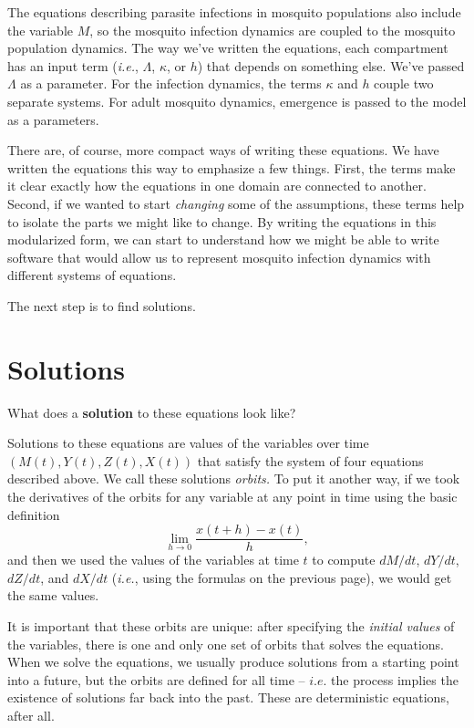 \documentclass[
]{book}
\begin{document}
The equations describing parasite infections in mosquito populations also include the variable \(M\), so the mosquito infection dynamics are coupled to the mosquito population dynamics. The way we've written the equations, each compartment has an input term (\emph{i.e.}, \(\Lambda\), \(\kappa\), or \(h\)) that depends on something else. We've passed \(\Lambda\) as a parameter. For the infection dynamics, the terms \(\kappa\) and \(h\) couple two separate systems. For adult mosquito dynamics, emergence is passed to the model as a parameters.

There are, of course, more compact ways of writing these equations. We have written the equations this way to emphasize a few things. First, the terms make it clear exactly how the equations in one domain are connected to another. Second, if we wanted to start \emph{changing} some of the assumptions, these terms help to isolate the parts we might like to change. By writing the equations in this modularized form, we can start to understand how we might be able to write software that would allow us to represent mosquito infection dynamics with different systems of equations.

The next step is to find solutions.

\hypertarget{solutions}{%
\section{Solutions}\label{solutions}}

What does a \textbf{solution} to these equations look like?

Solutions to these equations are values of the variables over time \(\left( M(t), Y(t), Z(t), X(t) \right)\) that satisfy the system of four equations described above. We call these solutions \emph{orbits.} To put it another way, if we took the derivatives of the orbits for any variable at any point in time using the basic definition \[\lim_{h\rightarrow 0} \frac{x(t+h)-x(t)}{h},\] and then we used the values of the variables at time \(t\) to compute \(dM/dt\), \(dY/dt\), \(dZ/dt\), and \(dX/dt\) (\emph{i.e.}, using the formulas on the previous page), we would get the same values.

It is important that these orbits are unique: after specifying the \emph{initial values} of the variables, there is one and only one set of orbits that solves the equations. When we solve the equations, we usually produce solutions from a starting point into a future, but the orbits are defined for all time -- \(i.e.\) the process implies the existence of solutions far back into the past. These are deterministic equations, after all.
\end{document}
